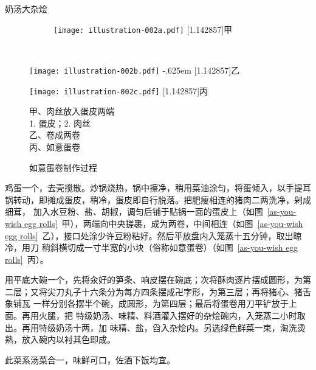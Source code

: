 \begin{recipe}{奶汤大杂烩}
\begin{figure}[h]
\vspace{-.6875\baselineskip}%
\begin{subfigure}[h]{\linewidth}%
\centering%
\texttt{[image: illustration-002a.pdf]}%
\baselineskip%
\hbox{\fsfamily\scalebox{1}[1.142857]{甲}}%
\end{subfigure}%
\vspace{.3125\baselineskip}%
\\%
%
\parbox{14.75em}{%
	\hspace{4em}\texttt{[image: illustration-002b.pdf]}%
	\kern-.625em\baselineskip%
	\hbox{\fsfamily\scalebox{1}[1.142857]{乙}}%
}%
\begin{minipage}{11em}
	\vspace{.25\baselineskip}%
	\texttt{[image: illustration-002c.pdf]}%
	\baselineskip%
	\hbox{\fsfamily\scalebox{1}[1.142857]{丙}}%
	\vspace{1.25\baselineskip}%
	\caption{如意蛋卷制作过程}
	\label{as-you-wish egg rolls}
	\vspace{1\baselineskip}%
	\begingroup%
	\small%
	\noindent%
	\null\hspace{1.5em}甲、肉丝放入蛋皮两端\\
	\null\hspace{3.5em}1. 蛋皮；\hspace{.5em}2. 肉丝\\
	\null\hspace{1.5em}乙、卷成两卷\\
	\null\hspace{1.5em}丙、如意蛋卷
	\endgroup
\end{minipage}
\vspace{-.75\baselineskip}%
\end{figure}%
\enlargethispage{-.434674\baselineskip}%

\step 鸡蛋一个，去壳搅散。炒锅烧热，锅中擦净，稍用菜油涂匀，将蛋倾入，以手提耳
锅转动，即摊成蛋皮，稍冷，蛋皮即自行脱落。把肥瘦相连的猪肉二两洗净，剁成细茸，
加入水豆粉、盐、胡椒，调匀后铺于贴锅一面的蛋皮上（如图~\ref{as-you-wish egg
rolls}~甲），两端向中央搓裹，成为两卷，中间相连（如图~\ref{as-you-wish egg
rolls}~乙），接口处涂少许豆粉粘好。然后平放盘内入笼蒸十五分钟，取出晾冷，用刀
稍斜横切成一寸半宽的小块（俗称如意蛋卷）（如图~\ref{as-you-wish egg
rolls}~丙）。

\step 用平底大碗一个，先将汆好的笋条、响皮摆在碗底；次将酥肉逐片摆成圆形，为第
二层；又将尖刀丸子十六条分为每方四条摆成卍字形，为第三层；再将猪心、猪舌象铺瓦
一样分别各摆半个碗，成圆形，为第四层；最后将蛋卷用刀平铲放于上面。再用火腿，把
特级奶汤、味精、料酒灌入摆好的杂烩碗内，入笼蒸二小时取出。再用特级奶汤十两，加
味精、盐，舀入杂烩内。另选绿色鲜菜一束，淘洗烫熟，放入碗内以衬其色即成。

\features

此菜系汤菜合一，味鲜可口，佐酒下饭均宜。

\end{recipe}

